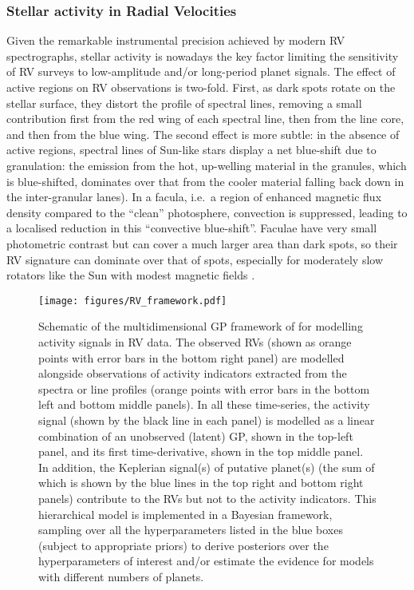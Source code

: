 \documentclass[letterpaper]{ar-1col}
\begin{document}
\subsubsection{Stellar activity in Radial Velocities} \label{sec:RVact}
Given the remarkable instrumental precision achieved by modern RV spectrographs, stellar activity is nowadays the key factor limiting the sensitivity of RV surveys to low-amplitude and/or long-period planet signals. The effect of active regions on RV observations is two-fold. First, as dark spots rotate on the stellar surface, they distort the profile of spectral lines, removing a small contribution first from the red wing of each spectral line, then from the line core, and then from the blue wing. The second effect is more subtle: in the absence of active regions, spectral lines of Sun-like stars display a net blue-shift due to granulation: the emission from the hot, up-welling material in the granules, which is blue-shifted, dominates over that from the cooler material falling back down in the inter-granular lanes). In a facula, i.e.\ a region of enhanced magnetic flux density compared to the ``clean'' photosphere, convection is suppressed, leading to a localised reduction in this ``convective blue-shift''. Faculae have very small photometric contrast but can cover a much larger area than dark spots, so their RV signature can dominate over that of spots, especially for moderately slow rotators like the Sun with modest magnetic fields \citep{2010A&A...512A..39M}.

\begin{figure}[ht]
  \texttt{[image: figures/RV\_framework.pdf]}
  \caption{Schematic of the multidimensional GP framework of \citet{2015MNRAS.452.2269R} for modelling activity signals in RV data. The observed RVs (shown as orange points with error bars in the bottom right panel) are modelled alongside observations of activity indicators extracted from the spectra or line profiles (orange points with error bars in the bottom left and bottom middle panels). In all these time-series, the activity signal (shown by the black line in each panel) is modelled as a linear combination of an unobserved (latent) GP, shown in the top-left panel, and its first time-derivative, shown in the top middle panel. In addition, the Keplerian signal(s) of putative planet(s) (the sum of which is shown by the blue lines in the top right and bottom right panels) contribute to the RVs but not to the activity indicators. This hierarchical model is implemented in a Bayesian framework, sampling over all the hyperparameters listed in the blue boxes (subject to appropriate priors) to derive posteriors over the hyperparameters of interest and/or estimate the evidence for models with different numbers of planets. }
  \label{fig:RV_framework}
\end{figure}
\end{document}
